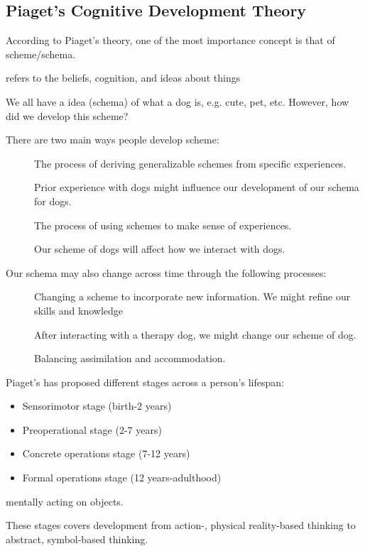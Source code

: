 \documentclass[../main/main.tex]{subfiles}
\begin{document}
\subsection{Piaget's Cognitive Development Theory}
According to Piaget's theory, one of the most importance concept is that of scheme/schema.
\begin{definition}
 refers to the beliefs, cognition, and ideas about things
\end{definition}
\begin{example}
We all have a idea (schema) of what a dog is, e.g. cute, pet, etc. However, how did we develop this scheme?
\end{example}
There are two main ways people develop scheme:
\begin{description}
  \item[] The process of deriving generalizable schemes from specific experiences.
        \begin{example}
Prior experience with dogs might influence our development of our schema for dogs.
        \end{example}
  \item[] The process of using schemes to make sense of experiences.
        \begin{remark}
Our scheme of dogs will affect how we interact with dogs.
        \end{remark}
\end{description}
Our schema may also change across time through the following processes:
\begin{description}
  \item[] Changing a scheme to incorporate new information. We might refine our skills and knowledge
        \begin{example}
          After interacting with a therapy dog, we might change our scheme of dog.
        \end{example}
  \item[] Balancing assimilation and accommodation.
\end{description}
Piaget's has proposed different stages across a person's lifespan:
\begin{itemize}
\item Sensorimotor stage (birth-2 years)
\item Preoperational stage (2-7 years)
\item Concrete operations stage (7-12 years)
\item Formal operations stage (12 years-adulthood)
\end{itemize}
\begin{definition}
 mentally acting on objects.
\end{definition}
These stages covers development from action-, physical reality-based thinking to abstract, symbol-based thinking.\\
\end{document}
